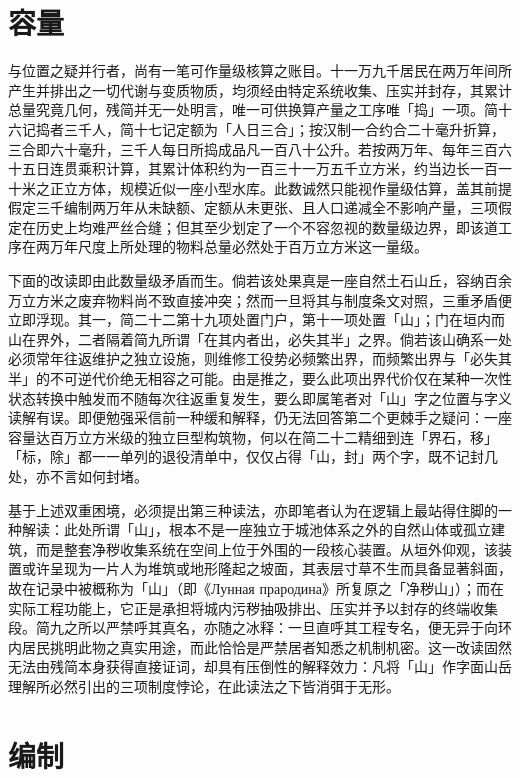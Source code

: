 \section{容量}

与位置之疑并行者，尚有一笔可作量级核算之账目。十一万九千居民在两万年间所产生并排出之一切代谢与变质物质，均须经由特定系统收集、压实并封存，其累计总量究竟几何，残简并无一处明言，唯一可供换算产量之工序唯「捣」一项。简十六记捣者三千人，简十七记定额为「人日三合」；按汉制一合约合二十毫升折算，三合即六十毫升，三千人每日所捣成品凡一百八十公升。若按两万年、每年三百六十五日连贯乘积计算，其累计体积约为一百三十一万五千立方米，约当边长一百一十米之正立方体，规模近似一座小型水库。此数诚然只能视作量级估算，盖其前提假定三千编制两万年从未缺额、定额从未更张、且人口递减全不影响产量，三项假定在历史上均难严丝合缝；但其至少划定了一个不容忽视的数量级边界，即该道工序在两万年尺度上所处理的物料总量必然处于百万立方米这一量级。

下面的改读即由此数量级矛盾而生。倘若该处果真是一座自然土石山丘，容纳百余万立方米之废弃物料尚不致直接冲突；然而一旦将其与制度条文对照，三重矛盾便立即浮现。其一，简二十二第十九项处置门户，第十一项处置「山」；门在垣内而山在界外，二者隔着简九所谓「在其内者出，必失其半」之界。倘若该山确系一处必须常年往返维护之独立设施，则维修工役势必频繁出界，而频繁出界与「必失其半」的不可逆代价绝无相容之可能。由是推之，要么此项出界代价仅在某种一次性状态转换中触发而不随每次往返重复发生，要么即属笔者对「山」字之位置与字义读解有误。即便勉强采信前一种缓和解释，仍无法回答第二个更棘手之疑问：一座容量达百万立方米级的独立巨型构筑物，何以在简二十二精细到连「界石，移」「标，除」都一一单列的退役清单中，仅仅占得「山，封」两个字，既不记封几处，亦不言如何封堵。

基于上述双重困境，必须提出第三种读法，亦即笔者认为在逻辑上最站得住脚的一种解读：此处所谓「山」，根本不是一座独立于城池体系之外的自然山体或孤立建筑，而是整套净秽收集系统在空间上位于外围的一段核心装置。从垣外仰观，该装置或许呈现为一片人为堆筑或地形隆起之坡面，其表层寸草不生而具备显著斜面，故在记录中被概称为「山」（即《Лунная прародина》所复原之「净秽山」）；而在实际工程功能上，它正是承担将城内污秽抽吸排出、压实并予以封存的终端收集段。简九之所以严禁呼其真名，亦随之冰释：一旦直呼其工程专名，便无异于向环内居民挑明此物之真实用途，而此恰恰是严禁居者知悉之机制机密。这一改读固然无法由残简本身获得直接证词，却具有压倒性的解释效力：凡将「山」作字面山岳理解所必然引出的三项制度悖论，在此读法之下皆消弭于无形。

\section{编制}

